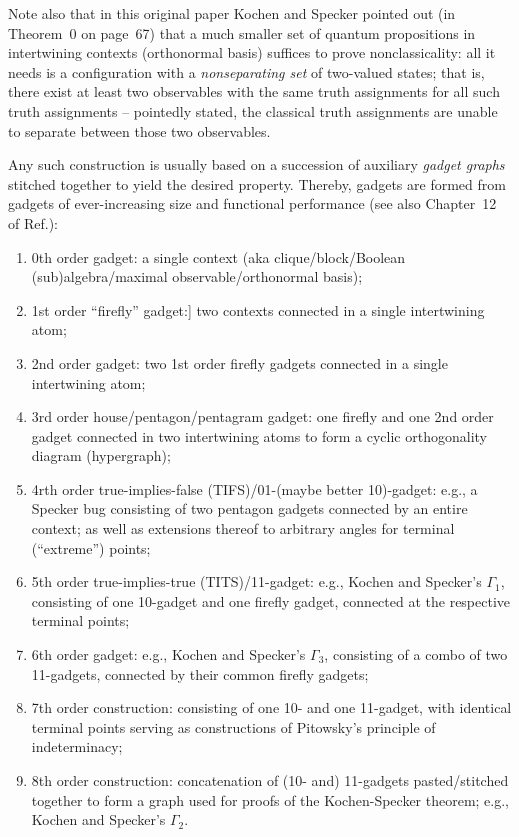 Note also that in this original paper Kochen and Specker pointed out (in Theorem~0 on page~67)
that a much smaller set of quantum propositions  in intertwining contexts (orthonormal basis) suffices
to prove nonclassicality: all it needs is a configuration with a {\em nonseparating set}
of two-valued states; that is, there exist at least two observables with the same truth assignments for all
such truth assignments -- pointedly stated, the classical truth assignments
are unable to separate between those two observables.

Any such construction is usually based on a succession of  auxiliary  {\em gadget graphs}\cite[-0mm]{tutte_1954,SZABO2009436,Ramanathan-18}
stitched together to yield the desired property.
Thereby, gadgets are formed from gadgets of ever-increasing size and functional performance
(see also Chapter~12 of Ref.\cite[-0mm]{svozil-2016-pu-book}):
\begin{enumerate}

\item 0th order gadget:  a single context (aka clique/block/Boolean (sub)algebra/maximal observable/orthonormal basis);

\item 1st order ``firefly'' gadget:] two contexts connected in a single intertwining atom;

\item 2nd order gadget:  two 1st order  firefly  gadgets connected in a single intertwining atom;

\item 3rd order house/pentagon/pentagram gadget:  one firefly and one 2nd order gadget connected in two intertwining atoms to form a cyclic orthogonality diagram (hypergraph);

\item 4rth order true-implies-false (TIFS)/01-(maybe better 10)-gadget:  e.g., a Specker bug consisting of two pentagon gadgets connected by an entire context;
as well as extensions thereof to arbitrary angles for terminal (``extreme'') points;

\item 5th order  true-implies-true (TITS)/11-gadget:  e.g.,  Kochen and Specker's $\Gamma_1$, consisting of one 10-gadget and one firefly gadget,
connected at the respective terminal points;

\item 6th order gadget:  e.g.,  Kochen and Specker's $\Gamma_3$,
consisting of a combo of two 11-gadgets, connected  by their common firefly gadgets;

\item 7th order construction:  consisting of one 10- and one 11-gadget, with identical terminal points serving as constructions of Pitowsky's
principle of indeterminacy;~\cite{pitowsky:218,2015-AnalyticKS,svozil-2018-whycontexts}

\item 8th order construction:  concatenation of (10- and) 11-gadgets pasted/stitched together to form a graph used for proofs of the Kochen-Specker theorem;
e.g.,  Kochen and Specker's $\Gamma_2$.
\end{enumerate}


